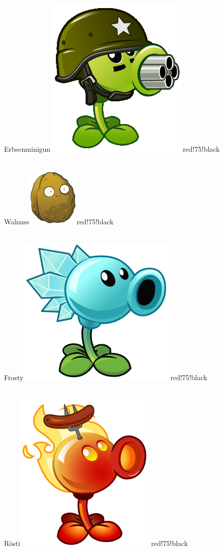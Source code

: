 \documentclass[11pt, a5paper]{article}
\begin{document}
	\begin{mybox}{Erbsenminigun}{\includegraphics[scale=0.1]{minigun}}{red!75!black}
		\phantom{My}\\ \\
	\end{mybox}
	
	\begin{mybox}{Walnuss}{\includegraphics[scale=0.25]{walnut}}{red!75!black}
		\phantom{My}\\ \\
	\end{mybox}
	
	\begin{mybox}{Frosty}{\includegraphics[scale=0.1]{frosty}}{red!75!black}
		\phantom{My}\\ \\
	\end{mybox}
	
	\begin{mybox}{Rösti}{\includegraphics[scale=0.1]{fire}}{red!75!black}
		\phantom{My}\\ \\
	\end{mybox}
\end{document}
